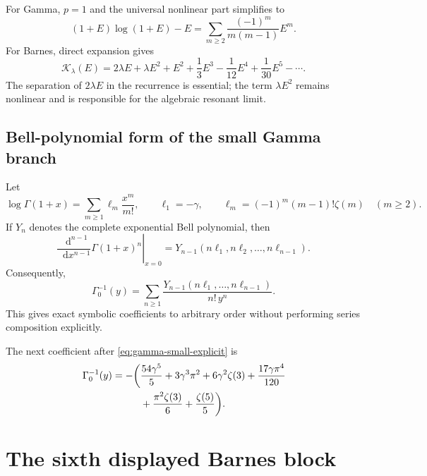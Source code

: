 \documentclass[11pt,oneside]{article}
\theoremstyle{plain}
\theoremstyle{definition}
\theoremstyle{remark}
\newcommand{\dd}{\mathop{}\!\mathrm{d}}
\newcommand{\Kcal}{\mathcal{K}}
\begin{document}
For Gamma, \(p=1\) and the universal nonlinear part simplifies to
\begin{equation}
 (1+E)\log(1+E)-E
 =\sum_{m\ge2}\frac{(-1)^m}{m(m-1)}E^m.
 \label{eq:gamma-kernel-series}
\end{equation}
For Barnes, direct expansion gives
\begin{equation}
 \Kcal_\lambda(E)
 =2\lambda E+\lambda E^2
 +E^2+\frac13E^3-\frac1{12}E^4
 +\frac1{30}E^5-\cdots.
 \label{eq:barnes-kernel-series}
\end{equation}
The separation of \(2\lambda E\) in the recurrence is essential; the term
\(\lambda E^2\) remains nonlinear and is responsible for the algebraic
resonant limit.

\subsection{Bell-polynomial form of the small Gamma branch}

Let
\begin{equation}
 \log\Gamma(1+x)=\sum_{m\ge1}\ell_m\frac{x^m}{m!},
 \qquad
 \ell_1=-\gamma,
 \qquad
 \ell_m=(-1)^m(m-1)!\zeta(m)\quad(m\ge2).
 \label{eq:ellm-loggamma}
\end{equation}
If \(Y_n\) denotes the complete exponential Bell polynomial, then
\begin{equation}
 \left.
 \frac{\dd^{n-1}}{\dd x^{n-1}}\Gamma(1+x)^n
 \right|_{x=0}
 =Y_{n-1}(n\ell_1,n\ell_2,\ldots,n\ell_{n-1}).
 \label{eq:small-gamma-bell}
\end{equation}
Consequently,
\begin{equation}
 \Gamma_0^{-1}(y)
 =\sum_{n\ge1}
 \frac{Y_{n-1}(n\ell_1,\ldots,n\ell_{n-1})}{n!\,y^n}.
 \label{eq:small-gamma-bell-series}
\end{equation}
This gives exact symbolic coefficients to arbitrary order without performing
series composition explicitly.

The next coefficient after \cref{eq:gamma-small-explicit} is
\begin{align}
 [y^{-6}]\,\Gamma_0^{-1}(y)=-\biggl({}&
 \frac{54\gamma^5}{5}+3\gamma^3\pi^2+6\gamma^2\zeta(3)
 +\frac{17\gamma\pi^4}{120}
 \notag\\
 &+\frac{\pi^2\zeta(3)}6+\frac{\zeta(5)}5
 \biggr).
 \label{eq:small-gamma-sixth}
\end{align}

\section{The sixth displayed Barnes block}
\label{app:barnes-b5}
\end{document}
